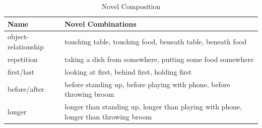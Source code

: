 \begin{table}[ht]
    \begin{center}
    \caption{Novel Composition}
    \label{novel_composition_table}
    \begin{tabular}{|p{2cm}|p{5cm}|}
    \hline
    \textbf{Name} & \textbf{Novel Combinations} \\
    \hline
    object-relationship & touching table, touching food, beneath table, beneath food\\
    \hline
    repetition & taking a dish from somewhere, putting some food somewhere\\
    \hline
    first/last & looking at first, behind first, holding first \\
    \hline
    before/after & before standing up, before playing with phone, before throwing broom\\
    \hline
    longer & longer than standing up, longer than playing with phone, longer than throwing broom\\
    \hline
    
    \end{tabular}
    
    \end{center}
\end{table}
